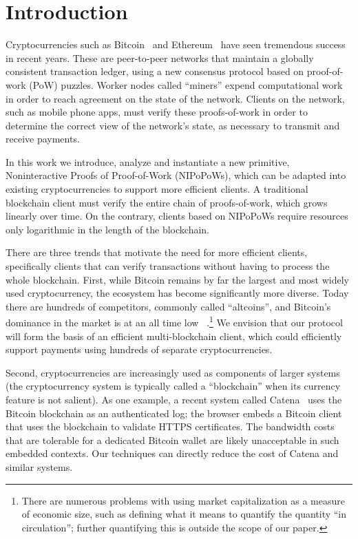\section{Introduction}

Cryptocurrencies such as Bitcoin~\cite{bitcoin} and Ethereum~\cite{ethereum}
have seen tremendous success in recent years. These are peer-to-peer networks
that maintain a globally consistent transaction ledger, using a new consensus
protocol based on proof-of-work (PoW) puzzles. Worker nodes called ``miners''
expend computational work in order to reach agreement on the state of the
network. Clients on the network, such as mobile phone apps, must verify these
proofs-of-work in order to determine the correct view of the network's state, as
necessary to transmit and receive payments.

In this work we introduce, analyze and instantiate a new primitive,
Noninteractive Proofs of Proof-of-Work (NIPoPoWs), which can be adapted into
existing cryptocurrencies to support more efficient clients. A traditional
blockchain client must verify the entire chain of proofs-of-work, which grows
linearly over time. On the contrary, clients based on NIPoPoWs require resources
only logarithmic in the length of the blockchain.

There are three trends that motivate the need for more efficient clients,
specifically clients that can verify transactions without having to process the
whole blockchain. First, while Bitcoin remains by far the largest and most
widely used cryptocurrency, the ecosystem has become significantly more diverse.
Today there are hundreds of competitors, commonly called ``altcoins'', and
Bitcoin's dominance in the market is at an all time low
~\cite{marketcap}.\footnote{There are numerous problems with using  market
capitalization as a measure of economic size, such as defining what it means to
quantify the quantity ``in circulation''; further quantifying this is outside
the scope of our paper.} We envision that our protocol will form the basis of an
efficient multi-blockchain client, which could efficiently support payments
using hundreds of separate cryptocurrencies.

Second, cryptocurrencies are increasingly used as components of larger systems
(the cryptocurrency system is typically called a ``blockchain'' when its
currency feature is not salient). As one example, a recent system called
Catena~\cite{catena} uses the Bitcoin blockchain as an authenticated log; the
browser embeds a Bitcoin client that uses the blockchain to validate HTTPS
certificates. The bandwidth costs that are tolerable for a dedicated Bitcoin
wallet are likely unacceptable in such embedded contexts. Our techniques can
directly reduce the cost of Catena and similar systems.

